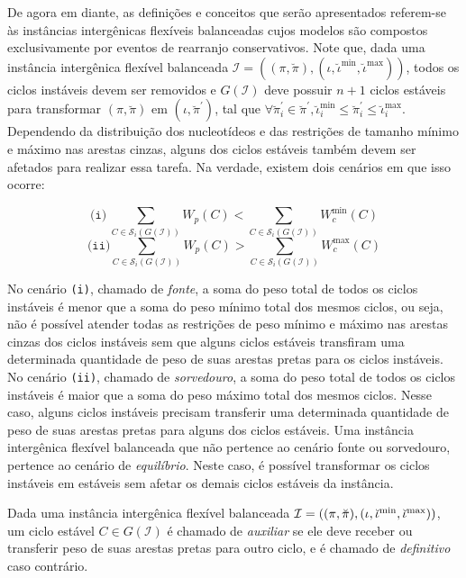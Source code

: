 De agora em diante, as definições e conceitos que serão apresentados referem-se às instâncias intergênicas flexíveis balanceadas cujos modelos são compostos exclusivamente por eventos de rearranjo conservativos. Note que, dada uma instância intergênica flexível balanceada $\mathcal{I} = ((\pi,\breve\pi),(\iota,\breve\iota^{\min},\breve\iota^{\max}))$, todos os ciclos instáveis devem ser removidos e $G(\mathcal{I})$ deve possuir $n+1$ ciclos estáveis para transformar $(\pi,\breve\pi)$ em $(\iota,\breve\pi^{\prime})$, tal que $\forall \breve\pi^{\prime}_i \in \breve\pi^{\prime}, \breve\iota^{\min}_i \le \breve\pi^{\prime}_i \le \breve\iota^{\max}_i$. Dependendo da distribuição dos nucleotídeos e das restrições de tamanho mínimo e máximo nas arestas cinzas, alguns dos ciclos estáveis também devem ser afetados para realizar essa tarefa. Na verdade, existem dois cenários em que isso ocorre:

$$\texttt{(i)}~\sum_{C \in \mathcal{S}_i(G(\mathcal{I}))} W_p(C) < \sum_{C \in \mathcal{S}_i(G(\mathcal{I}))} W^{\min}_c(C)$$
$$\texttt{(ii)}\sum_{C \in \mathcal{S}_i(G(\mathcal{I}))} W_p(C) > \sum_{C \in \mathcal{S}_i(G(\mathcal{I}))} W^{\max}_c(C)$$

No cenário \texttt{(i)}, chamado de \emph{fonte}, a soma do peso total de todos os ciclos instáveis é menor que a soma do peso mínimo total dos mesmos ciclos, ou seja, não é possível atender todas as restrições de peso mínimo e máximo nas arestas cinzas dos ciclos instáveis sem que alguns ciclos estáveis transfiram uma determinada quantidade de peso de suas arestas pretas para os ciclos instáveis. No cenário \texttt{(ii)}, chamado de \emph{sorvedouro}, a soma do peso total de todos os ciclos instáveis é maior que a soma do peso máximo total dos mesmos ciclos. Nesse caso, alguns ciclos instáveis precisam transferir uma determinada quantidade de peso de suas arestas pretas para alguns dos ciclos estáveis. Uma instância intergênica flexível balanceada que não pertence ao cenário fonte ou sorvedouro, pertence ao cenário de \emph{equilíbrio}. Neste caso, é possível transformar os ciclos instáveis em estáveis sem afetar os demais ciclos estáveis da instância.

\begin{definition}
Dada uma instância intergênica flexível balanceada $\mathcal{I} = ((\pi,\breve\pi),\break(\iota,\breve\iota^{\min},\breve\iota^{\max}))$, um ciclo estável $C \in G(\mathcal{I})$ é chamado de \emph{auxiliar} se ele deve receber ou transferir peso de suas arestas pretas para outro ciclo, e é chamado de \emph{definitivo} caso contrário.
\end{definition}

